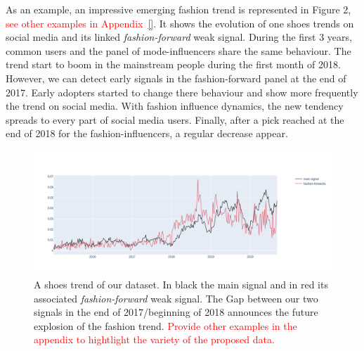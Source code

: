 \documentclass{article} %
\begin{document}



As an example, an impressive emerging fashion trend is represented in Figure 2, \textcolor{red}{see other examples in Appendix~\ref{}}. It shows the evolution of one shoes trends on social media and its linked \textit{fashion-forward} weak signal. During the first 3 years, common users and the panel of mode-influencers share the same behaviour. The trend start to boom in the mainstream people during the first month of 2018. However, we can detect early signals in the fashion-forward panel at the end of 2017. Early adopters started to change there behaviour and show more frequently the trend on social media. With fashion influence dynamics, the new tendency spreads to every part of social media users. Finally, after a pick reached at the end of 2018 for the fashion-influencers, a regular decrease appear. %

\begin{figure}
  \centering
    \includegraphics[width=1.\linewidth]{figure/good_example.png}
  \caption{A shoes trend of our dataset. In black the main signal and in red its associated \textit{fashion-forward} weak signal. The Gap between our two signals in the end of 2017/beginning of 2018 announces the future explosion of the fashion trend. \textcolor{red}{Provide other examples in the appendix to hightlight the variety of the proposed data.}}
\end{figure}
\end{document}
